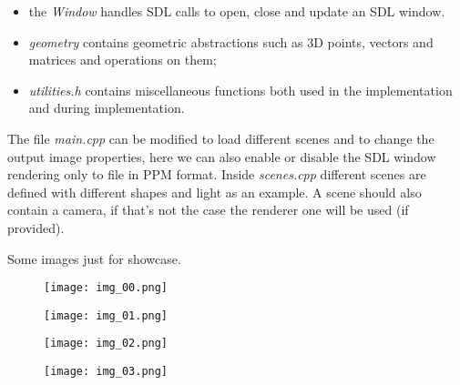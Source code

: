 \begin{itemize}
  \item the \emph{Window} handles SDL calls to open, close and update an SDL window.

  \item \emph{geometry} contains geometric abstractions such as 3D points, vectors and matrices and operations on them;
  \item \emph{utilities.h} contains miscellaneous functions both used in the implementation and during implementation.
\end{itemize}
The file \emph{main.cpp} can be modified to load different scenes and to change the output image properties, here we can also enable or disable the SDL window rendering only to file in PPM format.
Inside \emph{scenes.cpp} different scenes are defined with different shapes and light as an example.
A scene should also contain a camera, if that's not the case the renderer one will be used (if provided).












\clearpage
\noindent
Some images just for showcase.

\begin{figure}[!htb]
  \centering
  \texttt{[image: img\_00.png]}
\end{figure}

\begin{figure}[!htb]
  \centering
  \texttt{[image: img\_01.png]}
\end{figure}

\begin{figure}[!htb]
  \centering
  \texttt{[image: img\_02.png]}
\end{figure}

\begin{figure}[!htb]
  \centering
  \texttt{[image: img\_03.png]}
\end{figure}


